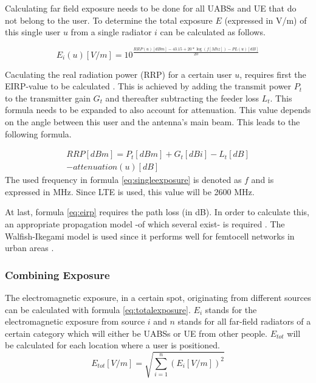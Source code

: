 \documentclass[twocolumn]{phdsymp} %
\begin{document}
Calculating far field exposure needs to be done for all UABSs and UE that do not belong to the user.
To determine the total exposure $E$ (expressed in V/m) of this single user $u$ from a single radiator $i$ can be calculated
as follows.

\begin{equation}
E_i(u) [V/m] = 10^{\frac{RRP(u)[dBm] - 43.15 + 20*\log(f [Mhz])- PL(u) [dB]}{20}}
\label{eq:singleexposure}
\end{equation}

Caculating the real radiation power (RRP) for a certain user $u$, requires first the EIRP-value to be calculated  \cite{J6_originalExposureFormula, J1}.
This is achieved by adding the transmit power $P_t$ to the transmitter gain $G_t$ and thereafter subtracting the feeder loss $L_t$.
This formula needs to be expanded to also account for attenuation. This value depends on the angle 
between this user and the antenna's main beam. This leads to the following formula.

\begin{equation}
\begin{aligned}
RRP [dBm] = P_t [dBm] + G_t [dBi]- L_t [dB]\\
     - attenuation(u) [dB]
\end{aligned}
\label{eq:eirp}
\end{equation}
The used frequency in formula \ref{eq:singleexposure} is denoted as $f$ and is expressed in MHz. Since LTE is used, this value will be 2600 MHz.

At last, formula \ref{eq:eirp} requires the path loss (in dB). In order to calculate this, an appropriate propagation model -of which several exist- is required .
The Walfish-Ikegami model is used since it performs well for femtocell networks in urban areas \cite{J2}. %

\subsubsection{Combining Exposure}
The electromagnetic exposure, in a certain spot, originating from different sources can be calculated with formula \ref{eq:totalexposure}. $E_i$ stands for 
the electromagnetic exposure from source $i$ and
$n$ stands for all far-field radiators of a certain category which will either be UABSs or UE from other people.
$E_{tot}$ will be calculated for each location where a user is positioned.  
\begin{equation}
E_{tot} [V/m] = \sqrt{\sum_{i=1}^{n} (E_i [V/m]) ^2}
\label{eq:totalexposure}
\end{equation}
\end{document}
